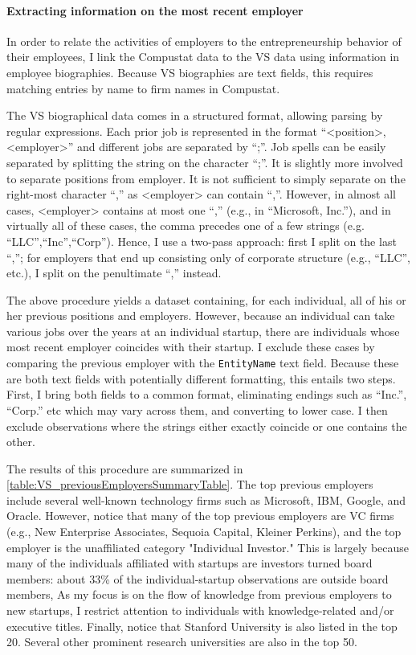 \documentclass[11pt,english]{article}
\begin{document}


\paragraph{Extracting information on the most recent employer}

In order to relate the activities of employers to the entrepreneurship behavior of their employees, I link the Compustat data to the VS data using information in employee biographies. Because VS biographies are text fields, this requires matching entries by name to firm names in Compustat.  

The VS biographical data comes in a structured format, allowing parsing by regular expressions. Each prior job is represented in the format ``<position>, <employer>'' and different jobs are separated by ``;''. Job spells can be easily separated by splitting the string on the character ``;''. It is slightly more involved to separate positions from employer. It is not sufficient to simply separate on the right-most character ``,'' as <employer> can contain ``,''. However, in almost all cases, <employer> contains at most one ``,'' (e.g., in ``Microsoft, Inc.''), and in virtually all of these cases, the comma precedes one of a few strings (e.g. ``LLC'',``Inc'',``Corp''). Hence, I use a two-pass approach: first I split on the last ``,''; for employers that end up consisting only of corporate structure (e.g., ``LLC'', etc.), I split on the penultimate ``,'' instead. 

The above procedure yields a dataset containing, for each individual, all of his or her previous positions and employers. However, because an individual can take various jobs over the years at an individual startup, there are individuals whose most recent employer coincides with their startup. I exclude these cases by comparing the previous employer with the \texttt{EntityName} text field. Because these are both text fields with potentially different formatting, this entails two steps. First, I bring both fields to a common format, eliminating endings such as ``Inc.'', ``Corp.'' etc which may vary across them, and converting to lower case. I then exclude observations where the strings either exactly coincide or one contains the other. 

The results of this procedure are summarized in \autoref{table:VS_previousEmployersSummaryTable}. The top previous employers include several well-known technology firms such as Microsoft, IBM, Google, and Oracle. However, notice that many of the top previous employers are VC firms (e.g., New Enterprise Associates, Sequoia Capital, Kleiner Perkins), and the top employer is the unaffiliated category "Individual Investor." This is largely because many of the individuals affiliated with startups are investors turned board members: about 33\% of the individual-startup observations are outside board members, As my focus is on the flow of knowledge from previous employers to new startups, I restrict attention to individuals with knowledge-related and/or executive titles. Finally, notice that Stanford University is also listed in the top 20. Several other prominent research universities are also in the top 50. 
\end{document}
